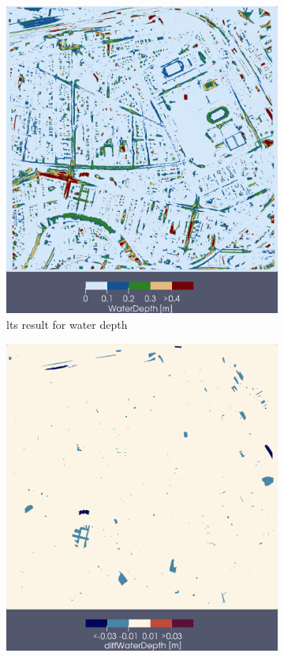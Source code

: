 \begin{figure} [p]
  \centering
  \begin{subfigure}[t]{0.45\textwidth}
    \centering
    \includegraphics[width=\textwidth]{./img/moabit-3600s-lts-fo-d.png}
    \caption{
      \acrshort{lts} result for water depth
    }
    \label{fig:moabit-3600s-lts-fo-d}
  \end{subfigure}
  \hspace{0.5cm}
  \begin{subfigure}[t]{0.45\textwidth}
    \centering
    \includegraphics[width=\textwidth]{./img/moabit-3600s-lts-fo-diff.png}

\end{subfigure}
\end{figure}
